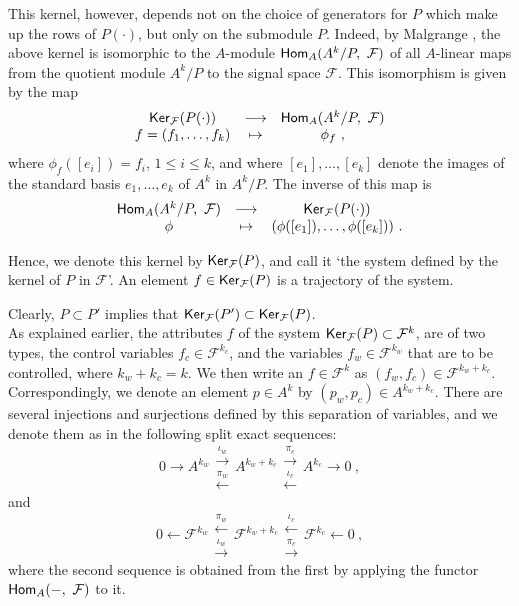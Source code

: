 \documentclass[11pt]{amsart}
\def\homo{\mathop{\sf Hom}}
\def\ker{\mathop{\sf Ker}}
\newcommand{\F}{\mathcal{F}}
\begin{document}
{This kernel, however, depends not on the choice of generators for $P$ which make up the rows of $P(\cdot)$, but only on the  submodule $P$. Indeed, by Malgrange \cite{m}, the above kernel is isomorphic to the $A$-module $\homo_{A}(A^k/P, ~\F)$ of all $A$-linear maps from the quotient module $A^k/P$ to the signal space $\F$. This isomorphism is given by the map
\begin{equation}
\begin{array}{ccc}
\ker_\F(P(\cdot))  & \longrightarrow & \homo_A(A^k/P, ~\F)  \\ 
 f=(f_1, \ldots, f_k) & \mapsto & \phi_f   ~,
 \end{array}
\end{equation}
where $\phi_f([e_i]) = f_i$, $1 \leqslant i \leqslant k$, and where $[e_1], \ldots ,[e_k]$ denote the images of the standard basis $e_1, \ldots ,e_k$ of $A^k$ in $A^k/P$. The inverse of this map is
\[
\begin{array}{ccc}
\homo_A(A^k/P,~ \F)  & \longrightarrow & \ker_\F (P(\cdot))\\
 \phi & \mapsto & (\phi([e_1]), \ldots , \phi([e_k]))  ~.
 \end{array}
\]
  
Hence, we denote this kernel  by $\ker_\F(P)$, and call it `the system defined by the kernel of $P$ in $\F$'. An element $f \in \ker_\F(P)$ is a trajectory of the system.  

Clearly, $P \subset P'$ implies that $\ker_\F(P') \subset \ker_\F(P)$. \\  

As explained earlier, the attributes $f$ of the system $\ker_\F(P) \subset \F^k$, are of two types, the control variables $f_c \in \F^{k_c}$, and the variables $f_w \in \F^{k_w}$ that are to be controlled, where $k_w + k_c = k$. We then write an $f \in \F^k$ as $(f_w, f_c) \in \F^{k_w+k_c}$. Correspondingly, we denote an element $p \in A^k$ by $(p_w, p_c) \in A^{k_w+k_c}$. There are several injections and surjections defined by this separation of variables, and we denote them as in the following split exact sequences:
\[
0 \rightarrow A^{k_w} \begin{array}{c} \stackrel{\iota_w}{\longrightarrow}\\\stackrel{\pi_w}{\longleftarrow} \end{array} A^{k_w+k_c} \begin{array}{c}\stackrel{\pi_c}{\longrightarrow}\\\stackrel{\iota_c}{\longleftarrow} \end{array} A^{k_c} \rightarrow 0 ~,
\]
and 
\[
0 \leftarrow \F^{k_w} \begin{array}{c} \stackrel{\pi_w}{\longleftarrow}\\ \stackrel{\iota_w}{\longrightarrow} \end{array} \F^{k_w+k_c} \begin{array}{c}\stackrel{\iota_c}{\longleftarrow}\\ \stackrel{\pi_c}{\longrightarrow} \end{array} \F^{k_c} \leftarrow 0 ~,
\]
where the second sequence is obtained from the first by applying the functor $\homo_A( - ,~\F)$ to it.

}
\end{document}

